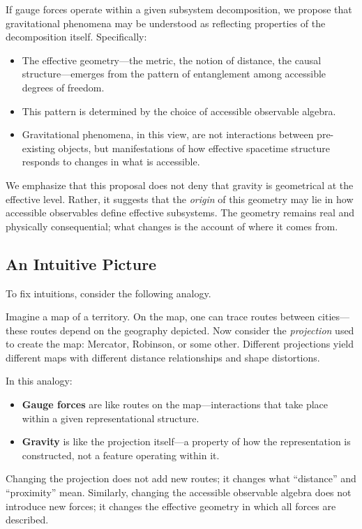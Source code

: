 \documentclass[12pt,a4paper,openany]{book}
\begin{document}
If gauge forces operate within a given subsystem decomposition, we propose that gravitational phenomena may be understood as reflecting properties of the decomposition itself. Specifically:

\begin{itemize}
    \item The effective geometry—the metric, the notion of distance, the causal structure—emerges from the pattern of entanglement among accessible degrees of freedom.
    \item This pattern is determined by the choice of accessible observable algebra.
    \item Gravitational phenomena, in this view, are not interactions between pre-existing objects, but manifestations of how effective spacetime structure responds to changes in what is accessible.
\end{itemize}

We emphasize that this proposal does not deny that gravity is geometrical at the effective level. Rather, it suggests that the \emph{origin} of this geometry may lie in how accessible observables define effective subsystems. The geometry remains real and physically consequential; what changes is the account of where it comes from.

\subsection{An Intuitive Picture}

To fix intuitions, consider the following analogy.

Imagine a map of a territory. On the map, one can trace routes between cities—these routes depend on the geography depicted. Now consider the \emph{projection} used to create the map: Mercator, Robinson, or some other. Different projections yield different maps with different distance relationships and shape distortions.

In this analogy:
\begin{itemize}
    \item \textbf{Gauge forces} are like routes on the map—interactions that take place within a given representational structure.
    \item \textbf{Gravity} is like the projection itself—a property of how the representation is constructed, not a feature operating within it.
\end{itemize}

Changing the projection does not add new routes; it changes what ``distance'' and ``proximity'' mean. Similarly, changing the accessible observable algebra does not introduce new forces; it changes the effective geometry in which all forces are described.
\end{document}
